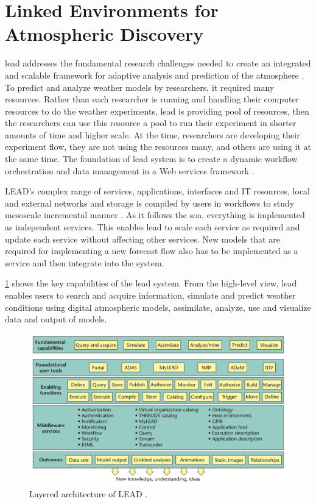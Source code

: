 \section{Linked Environments for Atmospheric Discovery}
\label{se:lead}

\acrfull{lead} addresses the fundamental research challenges needed to create an integrated and scalable framework for adaptive analysis and prediction of the atmosphere \cite{Droegemeier2005Service-OrientedWeather}. To predict and analyze weather models by researchers, it required many resources. Rather than each researcher is running and handling their computer resources to do the weather experiments, \acrshort{lead} is providing pool of resources, then the researchers can use this resource a pool to run their experiment in shorter amounts of time and higher scale. At the time, researchers are developing their experiment flow, they are not using the resources many, and others are using it at the same time. The foundation of \acrshort{lead} system is to create a dynamic workflow orchestration and data management in a Web services framework \cite{Droegemeier2005Service-OrientedWeather}.

LEAD's complex range of services, applications, interfaces and IT resources, local and external networks and storage is compiled by users in workflows to study mesoscale incremental manner \cite{Droegemeier2005Service-OrientedWeather}. As it follows the \acrshort{soa}, everything is implemented as independent services. This enables \acrshort{lead} to scale each service as required and update each service without affecting other services. New models that are required for implementing a new forecast flow also has to be implemented as a service and then integrate into the system.

\cref{fi:lead_system} shows the key capabilities of the \acrshort{lead} system. From the high-level view, \acrshort{lead} enables users to search and acquire information, simulate and predict weather conditions using digital atmospheric models, assimilate, analyze, use and visualize data and output of models.

\begin{figure}[htp]
    \centering
    \includegraphics[width=1.0\textwidth]{lit/lead/LEAD-system-Fundamental-capabilities-familiar-to-meteorologists-are-shown-in-the-top_W640.png}
    \caption[Layered architecture of LEAD]{Layered architecture of LEAD \cite{Droegemeier2005Service-OrientedWeather}.}
    \label{fi:lead_system}
\end{figure}

